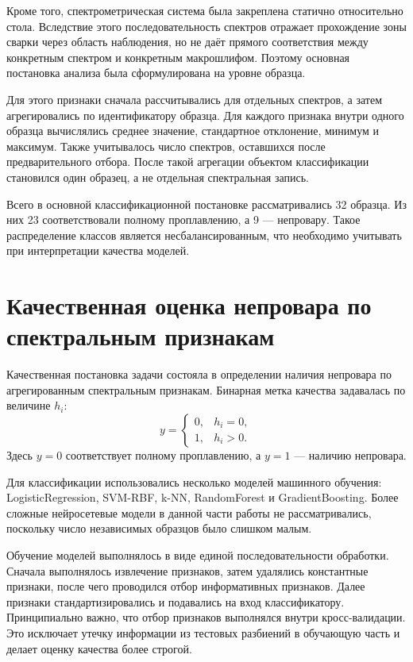 Кроме того, спектрометрическая система была закреплена статично относительно стола. Вследствие этого последовательность спектров отражает прохождение зоны сварки через область наблюдения, но не даёт прямого соответствия между конкретным спектром и конкретным макрошлифом. Поэтому основная постановка анализа была сформулирована на уровне образца.

Для этого признаки сначала рассчитывались для отдельных спектров, а затем агрегировались по идентификатору образца. Для каждого признака внутри одного образца вычислялись среднее значение, стандартное отклонение, минимум и максимум. Также учитывалось число спектров, оставшихся после предварительного отбора. После такой агрегации объектом классификации становился один образец, а не отдельная спектральная запись.

Всего в основной классификационной постановке рассматривались 32 образца. Из них 23 соответствовали полному проплавлению, а 9 --- непровару. Такое распределение классов является несбалансированным, что необходимо учитывать при интерпретации качества моделей.

\section{Качественная оценка непровара по спектральным признакам}

Качественная постановка задачи состояла в определении наличия непровара по агрегированным спектральным признакам. Бинарная метка качества задавалась по величине \(h_i\):
\[
y =
\begin{cases}
0, & h_i = 0,\\
1, & h_i > 0.
\end{cases}
\]
Здесь \(y = 0\) соответствует полному проплавлению, а \(y = 1\) --- наличию непровара.

Для классификации использовались несколько моделей машинного обучения: LogisticRegression, SVM-RBF, k-NN, RandomForest и GradientBoosting. Более сложные нейросетевые модели в данной части работы не рассматривались, поскольку число независимых образцов было слишком малым.

Обучение моделей выполнялось в виде единой последовательности обработки. Сначала выполнялось извлечение признаков, затем удалялись константные признаки, после чего проводился отбор информативных признаков. Далее признаки стандартизировались и подавались на вход классификатору. Принципиально важно, что отбор признаков выполнялся внутри кросс-валидации. Это исключает утечку информации из тестовых разбиений в обучающую часть и делает оценку качества более строгой.

